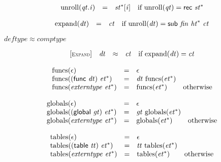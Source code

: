 $$
\begin{array}{@{}lcl@{}l@{}}
{\mathrm{unroll}}({\mathit{qt}} . {\mathit{i}}) &=& {{\mathit{st}}^\ast}{}[{\mathit{i}}] &\quad
  \mbox{if}~{\mathrm{unroll}}({\mathit{qt}}) = \mathsf{rec}~{{\mathit{st}}^\ast} \\
\end{array}
$$

$$
\begin{array}{@{}lcl@{}l@{}}
{\mathrm{expand}}({\mathit{dt}}) &=& {\mathit{ct}} &\quad
  \mbox{if}~{\mathrm{unroll}}({\mathit{dt}}) = \mathsf{sub}~{\mathit{fin}}~{{\mathit{ht}}^\ast}~{\mathit{ct}} \\
\end{array}
$$

$\boxed{{\mathit{deftype}} \approx {\mathit{comptype}}}$

$$
\begin{array}{@{}l@{}lcl@{}l@{}}
{[\textsc{\scriptsize Expand}]} \quad & {\mathit{dt}} &\approx& {\mathit{ct}} &\quad
  \mbox{if}~{\mathrm{expand}}({\mathit{dt}}) = {\mathit{ct}} \\
\end{array}
$$

\vspace{1ex}

$$
\begin{array}{@{}lcl@{}l@{}}
{\mathrm{funcs}}(\epsilon) &=& \epsilon &  \\
{\mathrm{funcs}}((\mathsf{func}~{\mathit{dt}})~{{\mathit{et}}^\ast}) &=& {\mathit{dt}}~{\mathrm{funcs}}({{\mathit{et}}^\ast}) &  \\
{\mathrm{funcs}}({\mathit{externtype}}~{{\mathit{et}}^\ast}) &=& {\mathrm{funcs}}({{\mathit{et}}^\ast}) &\quad
  \mbox{otherwise} \\
\end{array}
$$

$$
\begin{array}{@{}lcl@{}l@{}}
{\mathrm{globals}}(\epsilon) &=& \epsilon &  \\
{\mathrm{globals}}((\mathsf{global}~{\mathit{gt}})~{{\mathit{et}}^\ast}) &=& {\mathit{gt}}~{\mathrm{globals}}({{\mathit{et}}^\ast}) &  \\
{\mathrm{globals}}({\mathit{externtype}}~{{\mathit{et}}^\ast}) &=& {\mathrm{globals}}({{\mathit{et}}^\ast}) &\quad
  \mbox{otherwise} \\
\end{array}
$$

$$
\begin{array}{@{}lcl@{}l@{}}
{\mathrm{tables}}(\epsilon) &=& \epsilon &  \\
{\mathrm{tables}}((\mathsf{table}~{\mathit{tt}})~{{\mathit{et}}^\ast}) &=& {\mathit{tt}}~{\mathrm{tables}}({{\mathit{et}}^\ast}) &  \\
{\mathrm{tables}}({\mathit{externtype}}~{{\mathit{et}}^\ast}) &=& {\mathrm{tables}}({{\mathit{et}}^\ast}) &\quad
  \mbox{otherwise} \\
\end{array}
$$

